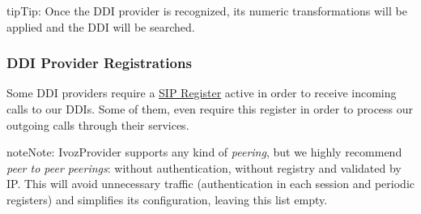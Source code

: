 \documentclass[letterpaper,10pt,english]{sphinxmanual}
\begin{document}
\begin{notice}{tip}{Tip:}
Once the DDI provider is recognized, its numeric transformations will be applied and the DDI will be searched.
\end{notice}


\subsubsection{DDI Provider Registrations}
\label{administration_portal/brand/providers/ddi_providers:ddi-provider-registrations}
Some DDI providers require a \href{https://tools.ietf.org/html/rfc3261\#section-10}{SIP Register} active in order to receive
incoming calls to our DDIs. Some of them, even require this register in order
to process our outgoing calls through their services.

\begin{notice}{note}{Note:}
IvozProvider supports any kind of \emph{peering}, but we highly recommend
\emph{peer to peer peerings}: without authentication, without registry and
validated by IP. This will avoid unnecessary traffic (authentication in each
session and periodic registers) and simplifies its configuration, leaving this list empty.
\end{notice}
\end{document}
